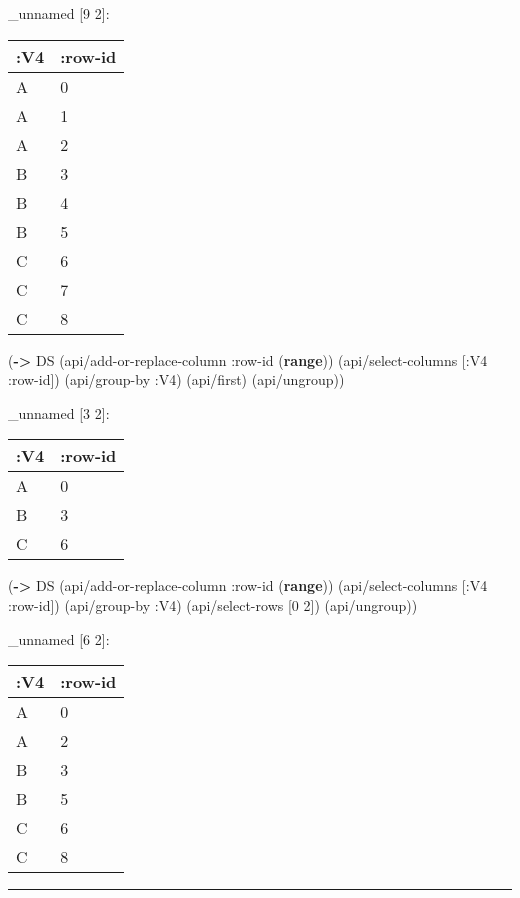 \documentclass[]{article}
\newenvironment{Shaded}{\begin{snugshade}}{\end{snugshade}}
\newcommand{\KeywordTok}[1]{\textcolor[rgb]{0.13,0.29,0.53}{\textbf{#1}}}
\newcommand{\DecValTok}[1]{\textcolor[rgb]{0.00,0.00,0.81}{#1}}
\newcommand{\AttributeTok}[1]{\textcolor[rgb]{0.77,0.63,0.00}{#1}}
\newcommand{\NormalTok}[1]{#1}
\begin{document}
\_unnamed {[}9 2{]}:

\begin{longtable}[]{@{}ll@{}}
\toprule
:V4 & :row-id\tabularnewline
\midrule
\endhead
A & 0\tabularnewline
A & 1\tabularnewline
A & 2\tabularnewline
B & 3\tabularnewline
B & 4\tabularnewline
B & 5\tabularnewline
C & 6\tabularnewline
C & 7\tabularnewline
C & 8\tabularnewline
\bottomrule
\end{longtable}

\begin{Shaded}
\begin{Highlighting}[]
\NormalTok{(}\KeywordTok{->}\NormalTok{ DS}
\NormalTok{    (api/add-or-replace-column }\AttributeTok{:row-id}\NormalTok{ (}\KeywordTok{range}\NormalTok{))}
\NormalTok{    (api/select-columns [}\AttributeTok{:V4} \AttributeTok{:row-id}\NormalTok{])}
\NormalTok{    (api/group-by }\AttributeTok{:V4}\NormalTok{)}
\NormalTok{    (api/first)}
\NormalTok{    (api/ungroup))}
\end{Highlighting}
\end{Shaded}

\_unnamed {[}3 2{]}:

\begin{longtable}[]{@{}ll@{}}
\toprule
:V4 & :row-id\tabularnewline
\midrule
\endhead
A & 0\tabularnewline
B & 3\tabularnewline
C & 6\tabularnewline
\bottomrule
\end{longtable}

\begin{Shaded}
\begin{Highlighting}[]
\NormalTok{(}\KeywordTok{->}\NormalTok{ DS}
\NormalTok{    (api/add-or-replace-column }\AttributeTok{:row-id}\NormalTok{ (}\KeywordTok{range}\NormalTok{))}
\NormalTok{    (api/select-columns [}\AttributeTok{:V4} \AttributeTok{:row-id}\NormalTok{])}
\NormalTok{    (api/group-by }\AttributeTok{:V4}\NormalTok{)}
\NormalTok{    (api/select-rows [}\DecValTok{0} \DecValTok{2}\NormalTok{])}
\NormalTok{    (api/ungroup))}
\end{Highlighting}
\end{Shaded}

\_unnamed {[}6 2{]}:

\begin{longtable}[]{@{}ll@{}}
\toprule
:V4 & :row-id\tabularnewline
\midrule
\endhead
A & 0\tabularnewline
A & 2\tabularnewline
B & 3\tabularnewline
B & 5\tabularnewline
C & 6\tabularnewline
C & 8\tabularnewline
\bottomrule
\end{longtable}

\begin{center}\rule{0.5\linewidth}{0.5pt}\end{center}
\end{document}
